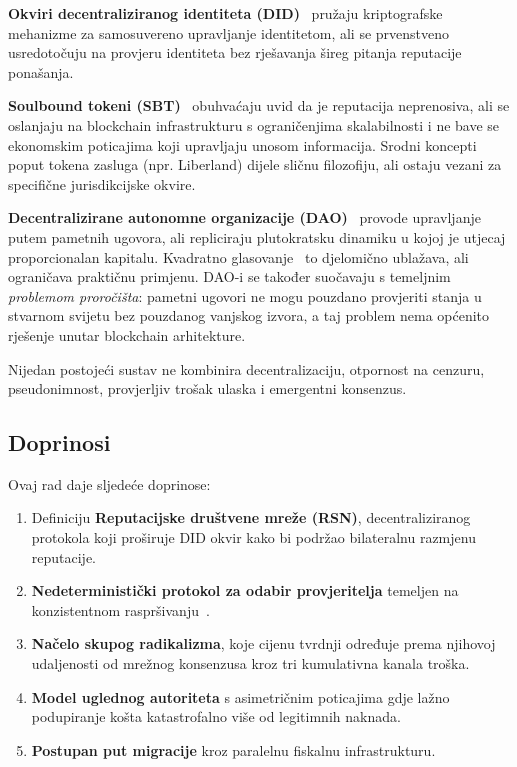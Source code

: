 \documentclass[11pt,a4paper,twocolumn]{article}
\begin{document}
\textbf{Okviri decentraliziranog identiteta (DID)}~\cite{did2022} pružaju kriptografske mehanizme za samosuvereno upravljanje identitetom, ali se prvenstveno usredotočuju na provjeru identiteta bez rješavanja šireg pitanja reputacije ponašanja.

\textbf{Soulbound tokeni (SBT)}~\cite{weyl2022} obuhvaćaju uvid da je reputacija neprenosiva, ali se oslanjaju na blockchain infrastrukturu s ograničenjima skalabilnosti i ne bave se ekonomskim poticajima koji upravljaju unosom informacija. Srodni koncepti poput tokena zasluga (npr. Liberland) dijele sličnu filozofiju, ali ostaju vezani za specifične jurisdikcijske okvire.

\textbf{Decentralizirane autonomne organizacije (DAO)}~\cite{buterin2014} provode upravljanje putem pametnih ugovora, ali repliciraju plutokratsku dinamiku u kojoj je utjecaj proporcionalan kapitalu. Kvadratno glasovanje~\cite{buterin2019} to djelomično ublažava, ali ograničava praktičnu primjenu. DAO-i se također suočavaju s temeljnim \emph{problemom proročišta}: pametni ugovori ne mogu pouzdano provjeriti stanja u stvarnom svijetu bez pouzdanog vanjskog izvora, a taj problem nema općenito rješenje unutar blockchain arhitekture.

Nijedan postojeći sustav ne kombinira decentralizaciju, otpornost na cenzuru, pseudonimnost, provjerljiv trošak ulaska i emergentni konsenzus.

\subsection{Doprinosi}

Ovaj rad daje sljedeće doprinose:
\begin{enumerate}[nosep]
\item Definiciju \textbf{Reputacijske društvene mreže (RSN)}, decentraliziranog protokola koji proširuje DID okvir kako bi podržao bilateralnu razmjenu reputacije.
\item \textbf{Nedeterministički protokol za odabir provjeritelja} temeljen na konzistentnom raspršivanju~\cite{karger1997}.
\item \textbf{Načelo skupog radikalizma}, koje cijenu tvrdnji određuje prema njihovoj udaljenosti od mrežnog konsenzusa kroz tri kumulativna kanala troška.
\item \textbf{Model uglednog autoriteta} s asimetričnim poticajima gdje lažno podupiranje košta katastrofalno više od legitimnih naknada.
\item \textbf{Postupan put migracije} kroz paralelnu fiskalnu infrastrukturu.
\end{enumerate}
\end{document}
